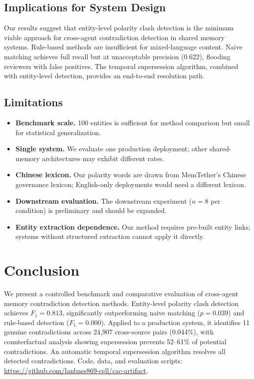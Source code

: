 \documentclass{article}
\begin{document}
\subsection{Implications for System Design}
Our results suggest that entity-level polarity clash detection is the minimum viable approach for cross-agent contradiction detection in shared memory systems. Rule-based methods are insufficient for mixed-language content. Naive matching achieves full recall but at unacceptable precision (0.622), flooding reviewers with false positives. The temporal supersession algorithm, combined with entity-level detection, provides an end-to-end resolution path.

\subsection{Limitations}
\begin{itemize}
\item \textbf{Benchmark scale.} 100 entities is sufficient for method comparison but small for statistical generalization.
\item \textbf{Single system.} We evaluate one production deployment; other shared-memory architectures may exhibit different rates.
\item \textbf{Chinese lexicon.} Our polarity words are drawn from MemTether's Chinese governance lexicon; English-only deployments would need a different lexicon.
\item \textbf{Downstream evaluation.} The downstream experiment ($n{=}8$ per condition) is preliminary and should be expanded.
\item \textbf{Entity extraction dependence.} Our method requires pre-built entity links; systems without structured extraction cannot apply it directly.
\end{itemize}

\section{Conclusion}
We present a controlled benchmark and comparative evaluation of cross-agent memory contradiction detection methods. Entity-level polarity clash detection achieves $F_1 = 0.813$, significantly outperforming naive matching ($p = 0.039$) and rule-based detection ($F_1 = 0.000$). Applied to a production system, it identifies 11 genuine contradictions across 24{,}907 cross-source pairs (0.044\%), with counterfactual analysis showing supersession prevents 52--61\% of potential contradictions. An automatic temporal supersession algorithm resolves all detected contradictions. Code, data, and evaluation scripts: \url{https://github.com/lanbass869-cell/cac-artifact}.
\end{document}
